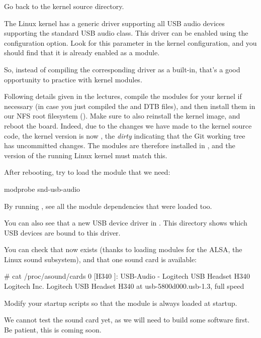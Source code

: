 Go back to the kernel source directory.

The Linux kernel has a generic driver supporting all USB audio devices
supporting the standard USB audio class. This driver can be enabled
using the  configuration option. Look
for this parameter in the kernel configuration, and you should find
that it is already enabled as a module.

So, instead of compiling the corresponding driver as a built-in, that's
a good opportunity to practice with kernel modules.

Following details given in the lectures, compile the modules for your
kernel if necessary (in case you just compiled the  and
DTB files), and then install them in our NFS root filesystem
(). Make sure to
also reinstall the kernel image, and reboot the board. Indeed, due to
the changes we have made to the kernel source code, the kernel version
is now , the {\em dirty} indicating that the Git
working tree has uncommitted changes. The modules are therefore
installed in , and the version of
the running Linux kernel must match this.

After rebooting, try to load the module that we need:

\begin{bashinput}
modprobe snd-usb-audio
\end{bashinput}

By running , see all the module dependencies that
were loaded too.

You can also see that a new USB device driver in
. This directory shows which
USB devices are bound to this driver.

You can check that  now exists (thanks to loading
modules for the ALSA, the Linux sound subsystem), and that one sound
card is available:

\begin{bashinput}
# cat /proc/asound/cards
 0 [H340           ]: USB-Audio - Logitech USB Headset H340
                      Logitech Inc. Logitech USB Headset H340 at usb-5800d000.usb-1.3, full speed
\end{bashinput}

Modify your startup scripts so that the  module
is always loaded at startup.

We cannot test the sound card yet, as we will need to build some
software first. Be patient, this is coming soon.

